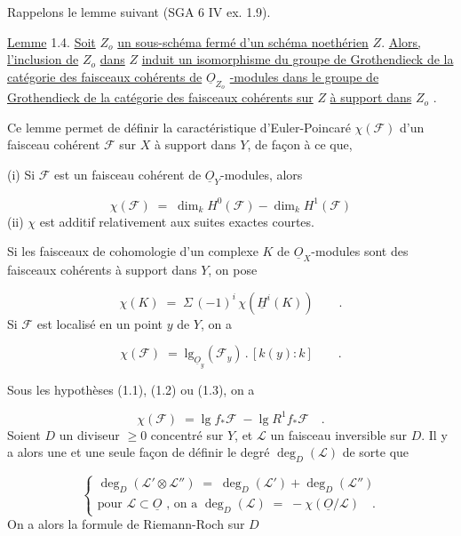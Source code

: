 Rappelons le lemme suivant (SGA 6 IV ex. 1.9).

\underline{Lemme} 1.4. \underline{Soit} $Z_o$ \underline{un sous-schéma fermé d'un schéma noethérien} $Z$. \underline{Alors, l'inclusion de} $Z_o$ \underline{dans} $Z$ \underline{induit un isomorphisme du groupe de Grothendieck de la catégorie des faisceaux cohérents de} $\underline{O}_{Z_o}$ \underline{-modules dans le groupe de Grothendieck de la catégorie des faisceaux cohérents sur} $Z$ \underline{à support dans} $Z_o$ .

Ce lemme permet de définir la caractéristique d'Euler-Poincaré $\chi(\mathcal{F})$ d'un faisceau cohérent $\mathcal{F}$ sur $X$ à support dans $Y$, de façon à ce que,

(i) Si $\mathcal{F}$ est un faisceau cohérent de $\underline{O}_Y$-modules, alors

\begin{equation}\tag{1.4.1}
\chi(\mathcal{F}) \;=\; \dim_k H^0(\mathcal{F}) - \dim_k H^1(\mathcal{F})
\end{equation}
(ii) $\chi$ est additif relativement aux suites exactes courtes.

Si les faisceaux de cohomologie d'un complexe $K$ de $\underline{O}_X$-modules sont des faisceaux cohérents à support dans $Y$, on pose

\begin{equation}\tag{1.4.2}
\chi(K) \;=\; \Sigma \, (-1)^i \, \chi(\underline{H}^i(K)) \qquad .
\end{equation}
Si $\mathcal{F}$ est localisé en un point $y$ de $Y$, on a

\begin{equation}\tag{1.4.3}
\chi(\mathcal{F}) \;=\; \mathrm{lg}_{\underline{O}_y}(\mathcal{F}_y) \, . \, [k(y) : k] \qquad .
\end{equation}


Sous les hypothèses (1.1), (1.2) ou (1.3), on a

\begin{equation}\tag{1.4.4}
\chi(\mathcal{F}) \;=\; \mathrm{lg}\; f_{*}\mathcal{F} \;-\; \mathrm{lg}\; R^{1}f_{*}\mathcal{F} \quad .
\end{equation}
Soient $D$ un diviseur $\geq 0$ concentré sur $Y$, et $\mathcal{L}$ un faisceau inversible sur $D$. Il y a alors une et une seule façon de définir le degré $\deg_D(\mathcal{L})$ de sorte que

\begin{equation}\tag{1.4.5}
\left\{
\begin{array}{l}
\deg_D(\mathcal{L}' \otimes \mathcal{L}'') \;=\; \deg_D(\mathcal{L}') + \deg_D(\mathcal{L}'') \\[3ex]
\text{pour } \mathcal{L} \subset \underline{O} \text{ , on a } \deg_D(\mathcal{L}) \;=\; - \chi(\underline{O}/\mathcal{L}) \quad .
\end{array}
\right.
\end{equation}
On a alors la formule de Riemann-Roch sur $D$

